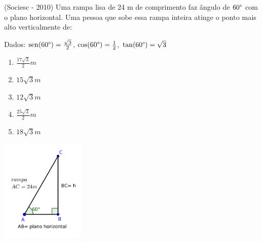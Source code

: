  \begin{exer}
 (Sociesc - 2010) Uma rampa lisa de 24 m de comprimento faz ângulo de $60\degree$ com o plano horizontal. Uma pessoa que sobe essa rampa inteira atinge o ponto mais alto verticalmente de:

  Dados: $\operatorname{sen} (60\degree)= \frac{\sqrt{3}}{2}$, $\cos (60\degree)= \frac{1}{2}$, $\tan (60\degree)= \sqrt{3}$
 \begin{multicols}{2}

 \begin{enumerate}
  \item $\frac{17 \sqrt{3}}{2} m$
  \item $15\sqrt{3} m$
  \item $12\sqrt{3} m$
  \item $\frac{25 \sqrt{3}}{2} m$
  \item $18\sqrt{3} m$
 \end{enumerate}

 \includegraphics[width=4cm]{./cap_trigon/figs/tri_ret_exer2}
 \end{multicols}
 \end{exer}
 
